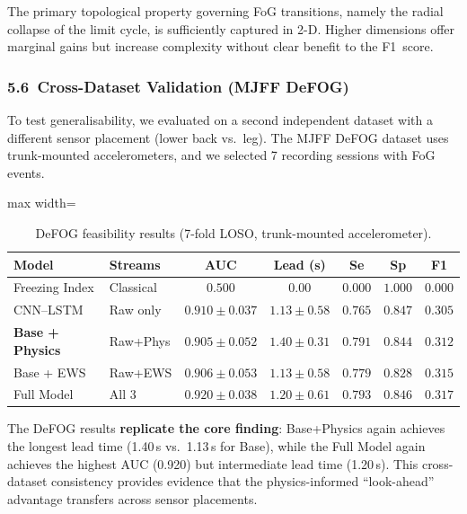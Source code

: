 \documentclass[12pt,a4paper]{article}
\begin{document}
\vspace{4pt}
\noindent The primary topological property governing FoG transitions, namely the radial collapse
of the limit cycle, is sufficiently captured in 2-D. Higher dimensions offer marginal gains but
increase complexity without clear benefit to the \mbox{F1 score}.

\subsubsection*{5.6\ Cross-Dataset Validation (MJFF DeFOG)}

To test generalisability, we evaluated on a second independent dataset with a different sensor
placement (lower back vs.\ leg). The MJFF DeFOG dataset uses trunk-mounted accelerometers, and
we selected 7 recording sessions with FoG events.

\begin{table}[ht]
\centering
\caption{DeFOG feasibility results (7-fold LOSO, trunk-mounted accelerometer).}
\label{tab:defog}
\renewcommand{\arraystretch}{1.25}
\begin{adjustbox}{max width=\textwidth}
\begin{tabular}{llccccc}
\toprule
\textbf{Model} & \textbf{Streams} & \textbf{AUC} & \textbf{Lead (s)} & \textbf{Se} & \textbf{Sp} & \textbf{F1} \\
\midrule
Freezing Index & Classical & $0.500$ & $0.00$ & $0.000$ & $1.000$ & $0.000$ \\
CNN--LSTM      & Raw only  & $0.910\!\pm\!0.037$ & $1.13\!\pm\!0.58$ & $0.765$ & $0.847$ & $0.305$ \\
\textbf{Base + Physics} & Raw+Phys & $0.905\!\pm\!0.052$ & $\mathbf{1.40\!\pm\!0.31}$ & $\mathbf{0.791}$ & $0.844$ & $0.312$ \\
Base + EWS     & Raw+EWS   & $0.906\!\pm\!0.053$ & $1.13\!\pm\!0.58$ & $0.779$ & $0.828$ & $0.315$ \\
Full Model     & All 3     & $\mathbf{0.920\!\pm\!0.038}$ & $1.20\!\pm\!0.61$ & $0.793$ & $\mathbf{0.846}$ & $\mathbf{0.317}$ \\
\bottomrule
\end{tabular}
\end{adjustbox}
\end{table}

\vspace{4pt}
\noindent The DeFOG results \textbf{replicate the core finding}: Base+Physics again achieves
the longest lead time (1.40\,s vs.\ 1.13\,s for Base), while the Full Model again achieves
the highest AUC (0.920) but intermediate lead time (1.20\,s). This cross-dataset consistency
provides evidence that the physics-informed ``look-ahead'' advantage transfers across sensor
placements.
\end{document}
